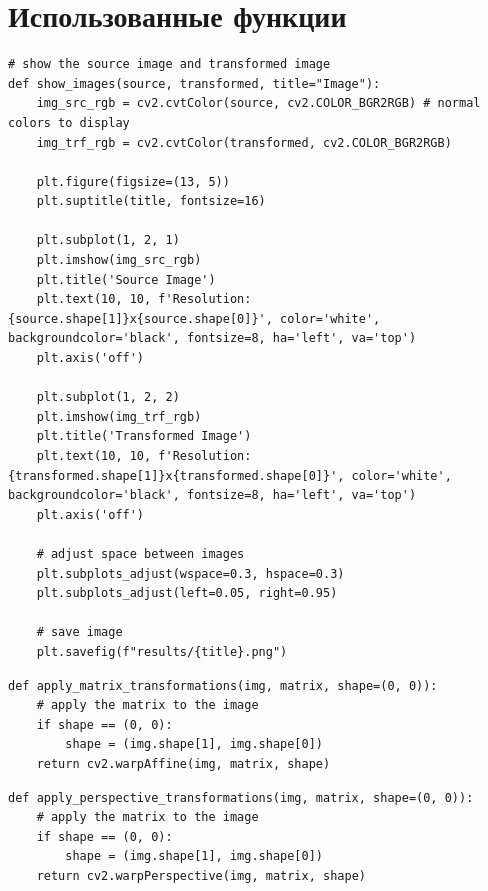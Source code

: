 \section{Использованные функции}

\begin{lstlisting}[caption={Функция для отображения исходного и преобразованного изображений}]
# show the source image and transformed image
def show_images(source, transformed, title="Image"):
    img_src_rgb = cv2.cvtColor(source, cv2.COLOR_BGR2RGB) # normal colors to display
    img_trf_rgb = cv2.cvtColor(transformed, cv2.COLOR_BGR2RGB) 

    plt.figure(figsize=(13, 5))
    plt.suptitle(title, fontsize=16)

    plt.subplot(1, 2, 1)
    plt.imshow(img_src_rgb)
    plt.title('Source Image')
    plt.text(10, 10, f'Resolution: {source.shape[1]}x{source.shape[0]}', color='white', backgroundcolor='black', fontsize=8, ha='left', va='top')
    plt.axis('off')

    plt.subplot(1, 2, 2)
    plt.imshow(img_trf_rgb)
    plt.title('Transformed Image')
    plt.text(10, 10, f'Resolution: {transformed.shape[1]}x{transformed.shape[0]}', color='white', backgroundcolor='black', fontsize=8, ha='left', va='top')
    plt.axis('off')

    # adjust space between images
    plt.subplots_adjust(wspace=0.3, hspace=0.3)
    plt.subplots_adjust(left=0.05, right=0.95)

    # save image
    plt.savefig(f"results/{title}.png")
\end{lstlisting}

\begin{lstlisting}[caption={Функция для применения матричных преобразований}]
def apply_matrix_transformations(img, matrix, shape=(0, 0)):
    # apply the matrix to the image
    if shape == (0, 0):
        shape = (img.shape[1], img.shape[0])
    return cv2.warpAffine(img, matrix, shape)
\end{lstlisting}

\begin{lstlisting}[caption={Функция для применения проективных преобразований}]
def apply_perspective_transformations(img, matrix, shape=(0, 0)):
    # apply the matrix to the image
    if shape == (0, 0):
        shape = (img.shape[1], img.shape[0])
    return cv2.warpPerspective(img, matrix, shape)
\end{lstlisting}

